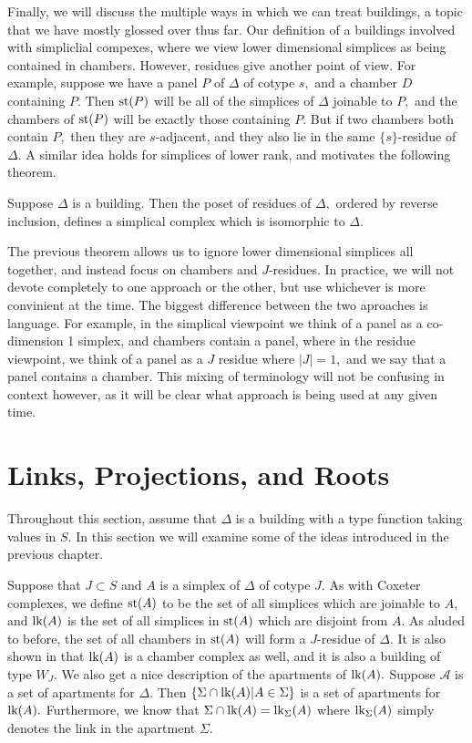 \documentclass[class=book, crop=false,12 pt]{standalone}
\begin{document}
Finally, we will discuss the multiple ways in which we can treat buildings, a topic that we have mostly glossed over thus far. Our definition of a buildings involved with simpliclial compexes, where we view lower dimensional simplices as being contained in chambers. However, residues give another point of view. For example, suppose we have a panel $P$ of $\Delta$ of cotype $s,$ and a chamber $D$ containing $P.$ Then $\mathrm{st}(P)$ will be all of the simplices of $\Delta$ joinable to $P,$ and the chambers of $\mathrm{st}(P)$ will be exactly those containing $P.$ But if two chambers both contain $P,$ then they are $s$-adjacent, and they also lie in the same $\{s\}$-residue of $\Delta.$ A similar idea holds for simplices of lower rank, and motivates the following theorem.
\begin{theorem}
	\label{thm:sim-cham}
	Suppose $\Delta$ is a building. Then the poset of residues of $\Delta,$ ordered by reverse inclusion, defines a simplical complex which is isomorphic to $\Delta.$
\end{theorem}
The previous theorem allows us to ignore lower dimensional simplices all together, and instead focus on chambers and $J$-residues. In practice, we will not devote completely to one approach or the other, but use whichever is more convinient at the time. The biggest difference between the two aproaches is language. For example, in the simplical viewpoint we think of a panel as a co-dimension 1 simplex, and chambers contain a panel, where in the residue viewpoint, we think of a panel as a $J$ residue where $|J|=1,$ and we say that a panel contains a chamber. This mixing of terminology will not be confusing in context however, as it will be clear what approach is being used at any given time.


\section{Links, Projections, and Roots}
Throughout this section, assume that $\Delta$ is a building with a type function taking values in $S.$ In this section we will examine some of the ideas introduced in the previous chapter.

Suppose that $J\subset S$ and $A$ is a simplex of $\Delta$ of cotype $J.$ As with Coxeter complexes, we define $\mathrm{st}(A)$ to be the set of all simplices which are joinable to $A,$ and $\mathrm{lk}(A)$ is the set of all simplices in $\mathrm{st}(A)$ which are disjoint from $A.$ As aluded to before, the set of all chambers in $\mathrm{st}(A)$ will form a $J$-residue of $\Delta.$ It is also shown in \cite{buildings} that $\mathrm{lk}(A)$ is a chamber complex as well, and it is also a building of type $W_J.$ We also get a nice description of the apartments of $\mathrm{lk}(A).$ Suppose $\mathcal{A}$ is a set of apartments for $\Delta.$ Then $\{\Sigma\cap \mathrm{lk}(A)|A\in \Sigma\}$ is a set of apartments for $\mathrm{lk}(A).$ Furthermore, we know that $\Sigma\cap \mathrm{lk}(A)=\mathrm{lk}_{\Sigma}(A)$ where $\mathrm{lk}_{\Sigma}(A)$ simply denotes the link in the apartment $\Sigma.$
\end{document}
